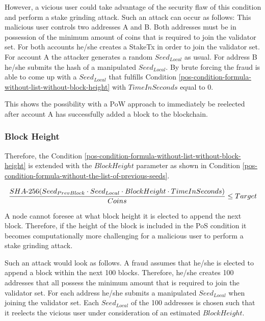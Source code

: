 However, a vicious user could take advantage of the security flaw of this condition and perform a stake grinding attack. Such an attack can occur as follows: This malicious user controls two addresses A and B. Both addresses must be in possession of the minimum amount of coins that is required to join the validator set. For both accounts he/she creates a StakeTx in order to join the validator set. For account A the attacker generates a random $ Seed_{Local} $ as usual. For address B he/she submits the hash of a manipulated $ Seed_{Local} $. By brute forcing the fraud is able to come up with a $ Seed_{Local} $ that fulfills Condition \ref{pos-condition-formula-without-list-without-block-height} with $ TimeInSeconds $ equal to 0. 

This shows the possibility with a PoW approach to immediately be reelected after account A has successfully added a block to the blockchain.

\subsubsection{Block Height}\label{stake-grinding-without-the-list-of-the-previous-seeds}
Therefore, the Condition \ref{pos-condition-formula-without-list-without-block-height} is extended with the $ BlockHeight $ parameter as shown in Condition \ref{pos-condition-formula-without-the-list-of-previous-seeds}.

\begin{equation} 
\label{pos-condition-formula-without-the-list-of-previous-seeds}
\frac{SHA{\text -}256(Seed_{PrevBlock} \cdot Seed_{Local} \cdot BlockHeight \cdot TimeInSeconds)}{Coins} \leq Target
\end{equation}

A node cannot foresee at what block height it is elected to append the next block. Therefore, if the height of the block is included in the PoS condition it becomes computationally more challenging for a malicious user to perform a stake grinding attack. 

Such an attack would look as follows. A fraud assumes that he/she is elected to append a block within the next 100 blocks. Therefore, he/she creates 100 addresses that all possess the minimum amount that is required to join the validator set. For each address he/she submits a manipulated $ Seed_{Local} $ when joining the validator set. Each $ Seed_{Local} $ of the 100 addresses is chosen such that it reelects the vicious user under consideration of an estimated $ BlockHeight $. 

